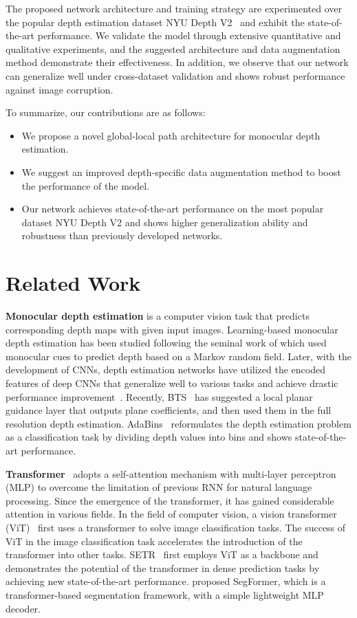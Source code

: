 \documentclass{article}
\makeatletter
\let\@internalcite\cite
\def\cite{\def\citeauthoryear##1##2{##1, ##2}\@internalcite}
\makeatother
\begin{document}
The proposed network architecture and training strategy are experimented over the popular depth estimation dataset NYU Depth V2~\cite{silberman2012indoor} and exhibit the state-of-the-art performance. We validate the model through extensive quantitative and qualitative experiments, and the suggested architecture and data augmentation method demonstrate their effectiveness.
In addition, we observe that our network can generalize well under cross-dataset validation and shows robust performance against image corruption.

To summarize, our contributions are as follows:

\begin{itemize}
    \item We propose a novel global-local path architecture for monocular depth estimation.
    \item We suggest an improved depth-specific data augmentation method to boost the performance of the model.
    \item Our network achieves state-of-the-art performance on the most popular dataset NYU Depth V2 and shows higher generalization ability and robustness than previously developed networks.
\end{itemize}


\section{Related Work}
\noindent\textbf{Monocular depth estimation} is a computer vision task that predicts corresponding depth maps with given input images. 
Learning-based monocular depth estimation has been studied following the seminal work of \cite{saxena2008make3d} which used monocular cues to predict depth based on a Markov random field.
Later, with the development of CNNs, depth estimation networks have utilized the encoded features of deep CNNs that generalize well to various tasks and achieve drastic performance improvement~\cite{eigen2014depth,huynh2020guiding,yin2019enforcing}.
Recently, BTS~\cite{lee2019big} has suggested a local planar guidance layer that outputs plane coefficients, and then used them in the full resolution depth estimation. AdaBins~\cite{bhat2021adabins} reformulates the depth estimation problem as a classification task by dividing depth values into bins and shows state-of-the-art performance. 

\noindent\textbf{Transformer}~\cite{vaswani2017attention} adopts a self-attention mechanism with multi-layer perceptron (MLP) to overcome the limitation of previous RNN for natural language processing.
Since the emergence of the transformer, it has gained considerable attention in various fields. In the field of computer vision, a vision transformer (ViT)~\cite{dosovitskiy2020image} first uses a transformer to solve image classification tasks. 
The success of ViT in the image classification task accelerates the introduction of the transformer into other tasks. 
SETR~\cite{zheng2021rethinking} first employs ViT as a backbone and demonstrates the potential of the transformer in dense prediction tasks by achieving new state-of-the-art performance.
\cite{xie2021segformer} proposed SegFormer, which is a transformer-based segmentation framework, with a simple lightweight MLP decoder.
\end{document}
